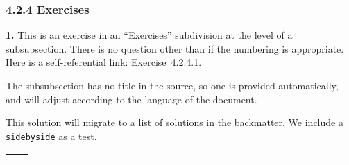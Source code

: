 \documentclass[10pt,]{article}
\theoremstyle{plain}
\theoremstyle{definition}
\theoremstyle{definition}
\theoremstyle{definition}
\theoremstyle{definition}
\theoremstyle{definition}
\theoremstyle{definition}
\numberwithin{equation}{section}
\newlength{\panelmax}
\begin{document}
\subsubsection*{4.2.4 Exercises}
\noindent\textbf{1.}\quad{}\hypertarget{p-114}{}%
This is an exercise in an ``Exercises'' subdivision at the level of a subsubsection.  There is no question other than if the numbering is appropriate.  Here is a self-referential link: Exercise~\hyperlink{exercise-test-number}{4.2.4.1}.%
\par
\hypertarget{p-115}{}%
The subsubsection has no title in the source, so one is provided automatically, and will adjust according to the language of the document.%
\par\smallskip
\hypertarget{p-116}{}%
This solution will migrate to a list of solutions in the backmatter.  We include a \lstinline?sidebyside? as a test.%
{%
\setlength{\panelmax}{0pt}
\ifdefined\panelboxAp\else\newsavebox{\panelboxAp}\fi%
\ifdefined\phAp\else\newlength{\phAp}\fi%
\setlength{\phAp}{\ht\panelboxAp+\dp\panelboxAp}
\settototalheight{\phAp}{\usebox{\panelboxAp}}
\setlength{\panelmax}{\maxof{\panelmax}{\phAp}}
\ifdefined\panelboxBp\else\newsavebox{\panelboxBp}\fi%
\ifdefined\phBp\else\newlength{\phBp}\fi%
\setlength{\phBp}{\ht\panelboxBp+\dp\panelboxBp}
\settototalheight{\phBp}{\usebox{\panelboxBp}}
\setlength{\panelmax}{\maxof{\panelmax}{\phBp}}
\leavevmode%
\setlength{\tabcolsep}{0.1\linewidth}
\par\medskip\noindent
\hspace*{0.1\linewidth}%
\begin{tabular}{@{}*{2}{c}@{}}
\begin{minipage}[c][\panelmax][t]{0.3\linewidth}\usebox{\panelboxAp}\end{minipage}&
\begin{minipage}[c][\panelmax][t]{0.3\linewidth}\usebox{\panelboxBp}\end{minipage}\end{tabular}\\
}%
\par\smallskip
\end{document}
